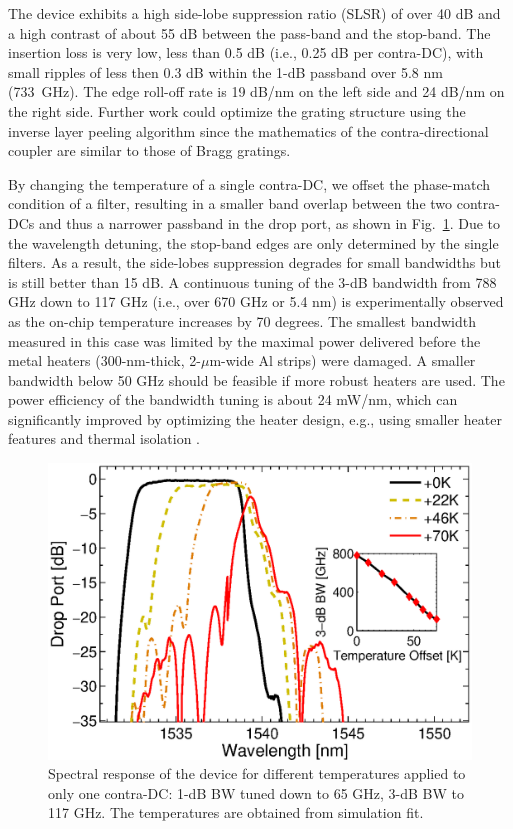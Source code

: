 \documentclass[osajnl,twocolumn,showpacs,superscriptaddress,10pt]{revtex4-1}
\begin{document}
The device exhibits a high side-lobe suppression ratio (SLSR) of over 40 dB and a high contrast of about 55 dB between the pass-band and the stop-band. 
The insertion loss is very low, less than 0.5 dB (i.e., 0.25 dB per contra-DC), with small ripples of less then 0.3 dB within the 1-dB passband over 5.8 nm (733~GHz). 
The edge roll-off rate is 19 dB/nm on the left side and 24 dB/nm on the right side.
Further work could optimize the grating structure using the inverse layer peeling algorithm\cite{skaar2001synthesis} since the mathematics of the contra-directional coupler are similar to those of Bragg gratings.

By changing the temperature of a single contra-DC, we offset the phase-match condition of a filter, resulting in a smaller band overlap between the two contra-DCs and thus a narrower passband in the drop port, as shown in Fig.~\ref{fig:bandTune}.  
Due to the wavelength detuning,  the stop-band edges are only determined by the single filters. 
As a result, the side-lobes suppression degrades  for small bandwidths but is still better than 15 dB. A continuous tuning of the 3-dB bandwidth from 788 GHz down to 117 GHz (i.e., over 670 GHz or 5.4 nm) is experimentally observed as the on-chip temperature increases by 70 degrees. 
The smallest bandwidth measured in this case was limited by the maximal power delivered before the metal heaters (300-nm-thick, 2-$\mu$m-wide Al strips) were damaged. A smaller bandwidth below 50 GHz should be feasible if more robust heaters are used.
The power efficiency of the bandwidth tuning is about 24 mW/nm, which can significantly improved by optimizing the heater design, e.g., using smaller heater features and thermal isolation \cite{dong2010thermally}.

\begin{figure}[htbp]
\centering
\includegraphics[width=.99\columnwidth]{data/Band6}
\caption{Spectral response of the device for different temperatures applied to only one contra-DC: 1-dB BW tuned down to 65 GHz, 3-dB BW to 117 GHz. The temperatures are obtained from simulation fit.}
\label{fig:bandTune}
\end{figure} 
\end{document}
